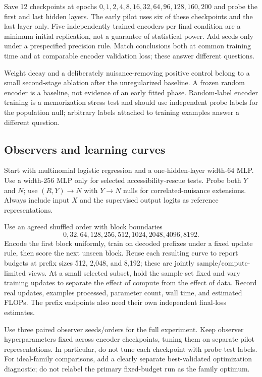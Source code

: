 \documentclass[11pt,a4paper]{article}
\begin{document}
Save 12 checkpoints at epochs $0,1,2,4,8,16,32,64,96,128,160,200$ and probe the first and last hidden layers. The early pilot uses six of these checkpoints and the last layer only. Five independently trained encoders per final condition are a minimum initial replication, not a guarantee of statistical power. Add seeds only under a prespecified precision rule. Match conclusions both at common training time and at comparable encoder validation loss; these answer different questions.

Weight decay and a deliberately nuisance-removing positive control belong to a small second-stage ablation after the unregularized baseline. A frozen random encoder is a baseline, not evidence of an early fitted phase. Random-label encoder training is a memorization stress test and should use independent probe labels for the population null; arbitrary labels attached to training examples answer a different question.

\subsection{Observers and learning curves}
Start with multinomial logistic regression and a one-hidden-layer width-64 MLP. Use a width-256 MLP only for selected accessibility-rescue tests. Probe both $Y$ and $N$; use $(R,Y)\to N$ with $Y\to N$ nulls for correlated-nuisance extensions. Always include input $X$ and the supervised output logits as reference representations.

Use an agreed shuffled order with block boundaries
\[
0,32,64,128,256,512,1024,2048,4096,8192.
\]
Encode the first block uniformly, train on decoded prefixes under a fixed update rule, then score the next unseen block. Reuse each resulting curve to report budgets at prefix sizes 512, 2,048, and 8,192; these are jointly sample/compute-limited views. At a small selected subset, hold the sample set fixed and vary training updates to separate the effect of compute from the effect of data. Record real updates, examples processed, parameter count, wall time, and estimated FLOPs. The prefix endpoints also need their own independent final-loss estimates.

Use three paired observer seeds/orders for the full experiment. Keep observer hyperparameters fixed across encoder checkpoints, tuning them on separate pilot representations. In particular, do not tune each checkpoint with probe-test labels. For ideal-family comparisons, add a clearly separate best-validated optimization diagnostic; do not relabel the primary fixed-budget run as the family optimum.
\end{document}
